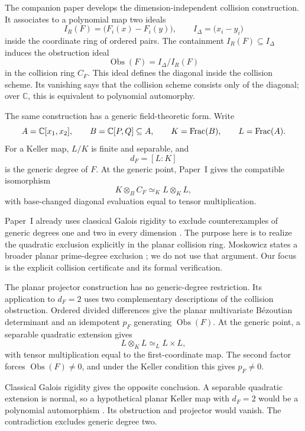 \documentclass[11pt]{article}
\newcommand{\C}{\mathbb C}
\newcommand{\Obs}{\operatorname{Obs}}
\begin{document}
The companion paper \cite{VanDerVlugt2026CubicCollision} develops the
dimension-independent collision construction.  It associates to a
polynomial map two ideals
\[
  I_R(F)=\bigl(F_i(x)-F_i(y)\bigr),
  \qquad
  I_\Delta=\bigl(x_i-y_i\bigr)
\]
inside the coordinate ring of ordered pairs.  The containment
\(I_R(F)\subseteq I_\Delta\) induces the obstruction ideal
\[
  \Obs(F)=I_\Delta/I_R(F)
\]
in the collision ring \(C_F\).  This ideal defines the diagonal inside the
collision scheme.  Its vanishing says that the collision scheme consists
only of the diagonal; over \(\C\), this is equivalent to polynomial
automorphy.

The same construction has a generic field-theoretic form.  Write
\[
  A=\C[x_1,x_2],\qquad
  B=\C[P,Q]\subseteq A,\qquad
  K=\Frac(B),\qquad
  L=\Frac(A).
\]
For a Keller map, \(L/K\) is finite and separable, and
\[
  d_F=[L:K]
\]
is the generic degree of \(F\).  At the generic point, Paper~I gives the
compatible isomorphism
\[
  K\otimes_BC_F\simeq_KL\otimes_KL,
\]
with base-changed diagonal evaluation equal to tensor multiplication.

Paper~I already uses classical Galois rigidity to exclude counterexamples
of generic degrees one and two in every dimension
\cite[Corollary~4.1]{VanDerVlugt2026CubicCollision}.  The purpose here is to
realize the quadratic exclusion explicitly in the planar collision ring.
Moskowicz states a broader planar prime-degree exclusion
\cite{Moskowicz2024PrimeDegree}; we do not use that argument.  Our focus is
the explicit collision certificate and its formal verification.

The planar projector construction has no generic-degree restriction.  Its
application to \(d_F=2\) uses two complementary descriptions of the
collision obstruction.  Ordered divided differences give the planar
multivariate B\'ezoutian determinant and an idempotent \(p_F\) generating
\(\Obs(F)\).  At the generic point, a separable quadratic extension gives
\[
  L\otimes_KL\simeq_L L\times L,
\]
with tensor multiplication equal to the first-coordinate map.  The second
factor forces \(\Obs(F)\neq0\), and under the Keller condition this gives
\(p_F\neq0\).

Classical Galois rigidity gives the opposite conclusion.  A separable
quadratic extension is normal, so a hypothetical planar Keller map with
\(d_F=2\) would be a polynomial automorphism
\cite{Campbell1973,Razar1979,Wright1981}.  Its obstruction and projector
would vanish.  The contradiction excludes generic degree two.
\end{document}
